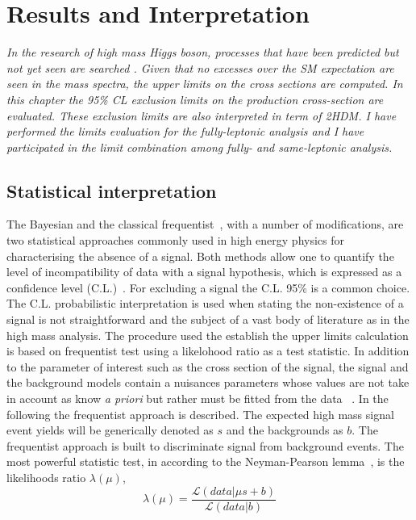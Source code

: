 \chapter{Results and Interpretation}
\label{cap7}

\textit{In the research of high mass Higgs boson, processes that have been predicted but not yet seen are searched . Given that no excesses over the SM expectation are seen in the mass spectra, the  upper limits on the cross sections are computed. In this chapter  the 95\% CL exclusion limits
on the production cross-section are evaluated. These exclusion limits are also interpreted in term  of 2HDM. I have performed the limits evaluation for the 
fully-leptonic analysis and I have participated in the limit combination among fully- and same-leptonic analysis. }

\section{Statistical interpretation}
\label{StatIn}
The Bayesian and the classical frequentist~\cite{cowan1998statistical}, with a number of modifications, are two statistical approaches commonly used in high energy physics for characterising the absence
of a signal.
Both methods allow one to quantify the level of incompatibility of data with a signal
hypothesis,  which  is  expressed  as  a  confidence  level  (C.L.)~\cite{CMS-NOTE-2011-005}. For excluding a signal the C.L. 95\% is a common choice.
The C.L. probabilistic interpretation is used when stating the non-existence
of a signal is not straightforward and the subject of a vast body of literature as in the high mass analysis.
The procedure used the establish the upper limits calculation is based on frequentist test using  a likelohood ratio as a test statistic. In addition to the parameter of interest such as the cross section of the signal, the signal and the background models contain a nuisances parameters whose values are not take in account as know \textit{a priori} but rather must be fitted from the data ~\cite{Cowan:2010js}.
In the following the frequentist approach is described.  The expected high mass signal  event yields will be generically denoted as $s$ and the backgrounds as $b$.
\newline
The  frequentist approach is built  to discriminate signal from background events. The most powerful statistic test, in according to the Neyman-Pearson lemma~\cite{cowan1998statistical}, is the likelihoods ratio $\lambda (\mu)$, 
\begin{equation}
  \lambda (\mu)=\frac{\mathcal{L}(data | \mu s +b)  }{ \mathcal{L}(data | b) }  \end{equation}
